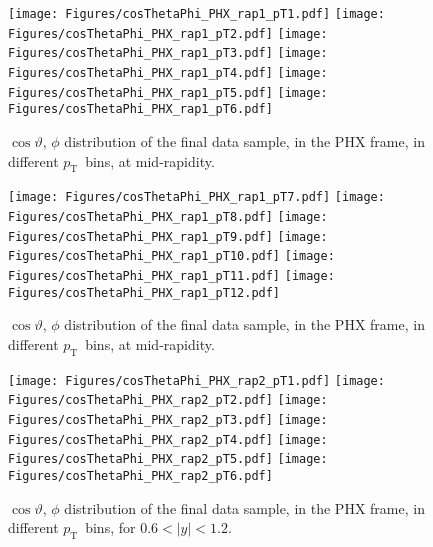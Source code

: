 \documentclass[12pt]{article}
\newcommand{\pt}{$p_{\mathrm{T}}$}
\begin{document}
%
%

\begin{figure}[htbp]
\centering
\texttt{[image: Figures/cosThetaPhi\_PHX\_rap1\_pT1.pdf]}
\texttt{[image: Figures/cosThetaPhi\_PHX\_rap1\_pT2.pdf]}
\texttt{[image: Figures/cosThetaPhi\_PHX\_rap1\_pT3.pdf]}
\texttt{[image: Figures/cosThetaPhi\_PHX\_rap1\_pT4.pdf]}
\texttt{[image: Figures/cosThetaPhi\_PHX\_rap1\_pT5.pdf]}
\texttt{[image: Figures/cosThetaPhi\_PHX\_rap1\_pT6.pdf]}
\caption{$\cos\vartheta,\,\phi$ distribution of the final data sample, 
	in the PHX frame, in different \pt\ bins, at mid-rapidity.}
\end{figure}
\clearpage

\begin{figure}[htbp]
\centering
\texttt{[image: Figures/cosThetaPhi\_PHX\_rap1\_pT7.pdf]}
\texttt{[image: Figures/cosThetaPhi\_PHX\_rap1\_pT8.pdf]}
\texttt{[image: Figures/cosThetaPhi\_PHX\_rap1\_pT9.pdf]}
\texttt{[image: Figures/cosThetaPhi\_PHX\_rap1\_pT10.pdf]}
\texttt{[image: Figures/cosThetaPhi\_PHX\_rap1\_pT11.pdf]}
\texttt{[image: Figures/cosThetaPhi\_PHX\_rap1\_pT12.pdf]}
\caption{$\cos\vartheta,\,\phi$ distribution of the final data sample, 
	in the PHX frame, in different \pt\ bins, at mid-rapidity.}
\end{figure}
\clearpage

\begin{figure}[htbp]
\centering
\texttt{[image: Figures/cosThetaPhi\_PHX\_rap2\_pT1.pdf]}
\texttt{[image: Figures/cosThetaPhi\_PHX\_rap2\_pT2.pdf]}
\texttt{[image: Figures/cosThetaPhi\_PHX\_rap2\_pT3.pdf]}
\texttt{[image: Figures/cosThetaPhi\_PHX\_rap2\_pT4.pdf]}
\texttt{[image: Figures/cosThetaPhi\_PHX\_rap2\_pT5.pdf]}
\texttt{[image: Figures/cosThetaPhi\_PHX\_rap2\_pT6.pdf]}
\caption{$\cos\vartheta,\,\phi$ distribution of the final data sample, 
	in the PHX frame, in different \pt\ bins, for $0.6 < |y| < 1.2$.}
\end{figure}
\clearpage
\end{document}
